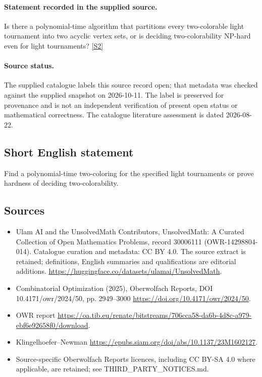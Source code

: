\documentclass[11pt]{article}
\begin{document}
\paragraph{Statement recorded in the supplied source.}
Is there a polynomial-time algorithm that partitions every two-colorable light tournament into two acyclic vertex sets, or is deciding two-colorability NP-hard even for light tournaments? \href{https://doi.org/10.4171/owr/2024/50}{[S2]}
\paragraph{Source status.}
The supplied catalogue labels this source record open; that metadata was checked against the supplied snapshot on 2026-10-11. The label is preserved for provenance and is not an independent verification of present open status or mathematical correctness. The catalogue literature assessment is dated 2026-08-22.
\subsection{Short English statement}
Find a polynomial-time two-coloring for the specified light tournaments or prove hardness of deciding two-colorability.
\subsection{Sources}
\begin{itemize}
\item[S1] Ulam AI and the UnsolvedMath Contributors, UnsolvedMath: A Curated Collection of Open Mathematics Problems, record 30006111 (OWR-14298804-014). Catalogue curation and metadata: CC BY 4.0. The source extract is retained; definitions, English summaries and qualifications are editorial additions.
\url{https://huggingface.co/datasets/ulamai/UnsolvedMath}.
\item[S2] Combinatorial Optimization (2025), Oberwolfach Reports, DOI 10.4171/owr/2024/50, pp. 2949--3000
\url{https://doi.org/10.4171/owr/2024/50}.
\item[S3] OWR report
\url{https://oa.tib.eu/renate/bitstreams/706cca58-da6b-4d8c-a979-ebf6e92658f0/download}.
\item[S4] Klingelhoefer--Newman
\url{https://epubs.siam.org/doi/abs/10.1137/23M1602127}.
\item Source-specific Oberwolfach Reports licences, including CC BY-SA 4.0 where applicable, are retained; see THIRD\_PARTY\_NOTICES.md.
\end{itemize}
\end{document}

